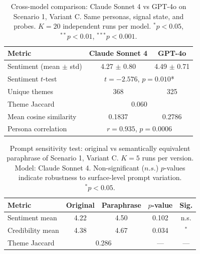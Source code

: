 \begin{table}[H]
\centering
\caption{Cross-model comparison: Claude Sonnet 4 vs GPT-4o on Scenario 1, Variant C.
Same personas, signal state, and probes. $K=20$ independent runs per model.
$^*p<0.05$, $^{**}p<0.01$, $^{***}p<0.001$.}
\label{tab:exp7_cross_model}
\small
\begin{tabular}{@{}lcc@{}}
\toprule
\textbf{Metric} & \textbf{Claude Sonnet 4} & \textbf{GPT-4o} \\
\midrule
Sentiment (mean $\pm$ std) & 4.27 $\pm$ 0.80 & 4.49 $\pm$ 0.71 \\
Sentiment $t$-test & \multicolumn{2}{c}{$t=-2.576$, $p=0.010$*} \\
Unique themes & 368 & 325 \\
Theme Jaccard & \multicolumn{2}{c}{0.060} \\
Mean cosine similarity & 0.1837 & 0.2786 \\
Persona correlation & \multicolumn{2}{c}{$r=0.935$, $p=0.0006$} \\
\bottomrule
\end{tabular}
\end{table}


\begin{table}[H]
\centering
\caption{Prompt sensitivity test: original vs semantically equivalent paraphrase of
Scenario 1, Variant C. $K=5$ runs per version. Model: Claude Sonnet 4.
Non-significant ($n.s.$) $p$-values indicate robustness to surface-level prompt variation.
$^*p<0.05$.}
\label{tab:exp8_sensitivity}
\small
\begin{tabular}{@{}lcccc@{}}
\toprule
\textbf{Metric} & \textbf{Original} & \textbf{Paraphrase} & \textbf{$p$-value} & \textbf{Sig.} \\
\midrule
Sentiment mean & 4.22 & 4.50 & 0.102 & n.s. \\
Credibility mean & 4.38 & 4.67 & 0.034 & $^*$ \\
Theme Jaccard & \multicolumn{2}{c}{0.286} & --- & --- \\
\bottomrule
\end{tabular}
\end{table}


